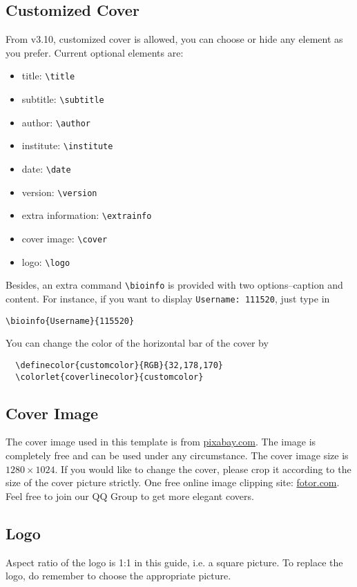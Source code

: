 \documentclass[11pt]{elegantbook}
\begin{document}
\subsection{Customized Cover}
From v3.10, customized cover is allowed, you can choose or hide any element as you prefer. Current optional elements are:
\begin{itemize}
  \item title: \lstinline{\title}
  \item subtitle: \lstinline{\subtitle}
  \item author: \lstinline{\author}
  \item institute: \lstinline{\institute}
  \item date: \lstinline{\date}
  \item version: \lstinline{\version}
  \item extra information: \lstinline{\extrainfo}
  \item cover image: \lstinline{\cover}
  \item logo: \lstinline{\logo}
\end{itemize}

Besides, an extra command \lstinline{\bioinfo} is provided with two options--caption and content. For instance, if you want to display \lstinline{Username: 111520}, just type in

\begin{lstlisting}
\bioinfo{Username}{115520}
\end{lstlisting}

You can change the color of the horizontal bar of the cover by
\begin{lstlisting}
  \definecolor{customcolor}{RGB}{32,178,170}
  \colorlet{coverlinecolor}{customcolor}
\end{lstlisting}

\subsection{Cover Image}
The cover image used in this template is from \href{https://pixabay.com/en/tea-time-poetry-coffee-reading-3240766/}{pixabay.com}. The image is completely free and can be used under any circumstance. The cover image size is $1280 \times 1024$. If you would like to change the cover, please crop it according to the size of the cover picture strictly. One free online image clipping site: \href{https://www.fotor.com/cn}{fotor.com}. Feel free to join our QQ Group to get more elegant covers.

\subsection{Logo}
Aspect ratio of the logo is 1:1 in this guide, i.e. a square picture. To replace the logo, do remember to choose the appropriate picture.
\end{document}
